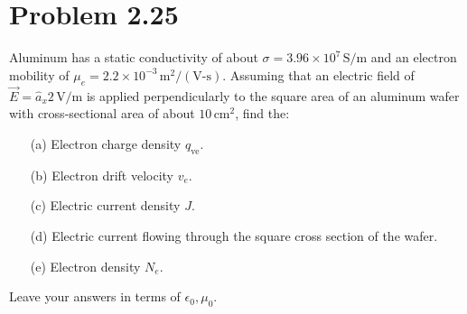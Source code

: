 \documentclass[12pt]{article}
\begin{document}
\section*{Problem 2.25}
Aluminum has a static conductivity of about \( \sigma = 3.96 \times 10^7 \, \text{S/m} \) and an electron mobility of \( \mu_e = 2.2 \times 10^{-3} \, \text{m}^2/(\text{V-s}) \). Assuming that an electric field of \( \vec{E} = \hat{a}_x 2 \, \text{V/m} \) is applied perpendicularly to the square area of an aluminum wafer with cross-sectional area of about \( 10 \, \text{cm}^2 \), find the:
\begin{itemize}
    \item[(a)] Electron charge density \( q_{\text{ve}} \).
    \item[(b)] Electron drift velocity \( v_e \).
    \item[(c)] Electric current density \( J \).
    \item[(d)] Electric current flowing through the square cross section of the wafer.
    \item[(e)] Electron density \( N_e \).
\end{itemize}
Leave your answers in terms of \( \epsilon_0, \mu_0 \).




\end{document}
